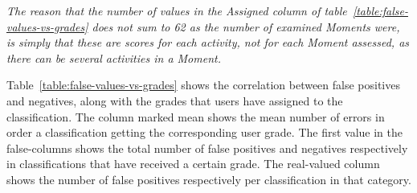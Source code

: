 \emph{
    The reason that the number of values in the Assigned column
    of table~\ref{table:false-values-vs-grades} does not sum to
    62 as the number of examined Moments were, is simply that these
    are scores for each activity, not for each Moment assessed, as 
    there can be several activities in a Moment. }

Table~\ref{table:false-values-vs-grades} shows the correlation 
between false positives and negatives, along with the grades 
that users have assigned to the classification. 
The column marked mean shows the mean number of errors in order a
classification getting the corresponding user grade. The first value 
in the false-columns shows the total number of false positives 
and negatives respectively in classifications that have received 
a certain grade. The real-valued column shows the number of false 
positives respectively per classification in that category. 
